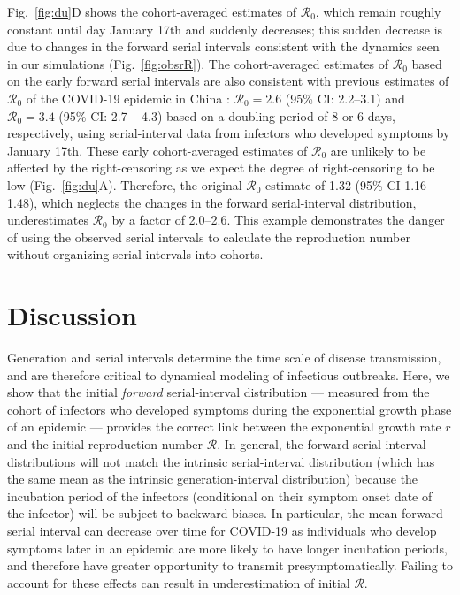 \documentclass[12pt]{article}
\newcommand{\fref}[1]{Fig.~\ref{fig:#1}}
\newcommand{\Rx}[1]{\ensuremath{{\mathcal R}_{#1}}\xspace}
\newcommand{\Ro}{\Rx{0}}
\newcommand{\RR}{\ensuremath{{\mathcal R}}\xspace}
\begin{document}
\fref{du}D shows the cohort-averaged estimates of \Ro, which remain roughly constant until day January 17th and suddenly decreases;
this sudden decrease is due to changes in the forward serial intervals consistent with the dynamics seen in our simulations (\fref{obsrR}).
The cohort-averaged estimates of \Ro based on the early forward serial intervals are also consistent with previous estimates of \Ro of the COVID-19 epidemic in China \citep{majumder2020early, doi:10.1098/rsif.2020.0144}:
$\Ro = 2.6$ (95\% CI: 2.2--3.1) and $\Ro = 3.4$ (95\% CI: 2.7 -- 4.3) based on a doubling period of 8 or 6 days, respectively, using serial-interval data from infectors who developed symptoms by January 17th.
These early cohort-averaged estimates of \Ro are unlikely to be affected by the right-censoring as we expect the degree of right-censoring to be low (\fref{du}A).
Therefore, the original \Ro estimate of 1.32 (95\% CI 1.16-–1.48), which neglects the changes in the forward serial-interval distribution, underestimates \Ro by a factor of 2.0--2.6.
This example demonstrates the danger of using the observed serial intervals to calculate the reproduction number without organizing serial intervals into cohorts.

\section{Discussion}

Generation and serial intervals determine the time scale of disease transmission, and are therefore critical to dynamical modeling of infectious outbreaks.
Here, we show that the initial \emph{forward} serial-interval distribution --- measured from the cohort of infectors who developed symptoms during the exponential growth phase of an epidemic --- provides the correct link between the exponential growth rate $r$ and the initial reproduction number \RR.
In general, the forward serial-interval distributions will not match the intrinsic serial-interval distribution (which has the same mean as the intrinsic generation-interval distribution) because the incubation period of the infectors (conditional on their symptom onset date of the infector) will be subject to backward biases.
In particular, the mean forward serial interval can decrease over time for COVID-19 as individuals who develop symptoms later in an epidemic are more likely to have longer incubation periods, and therefore have greater opportunity to transmit presymptomatically.
Failing to account for these effects can result in underestimation of initial \RR.
\end{document}
